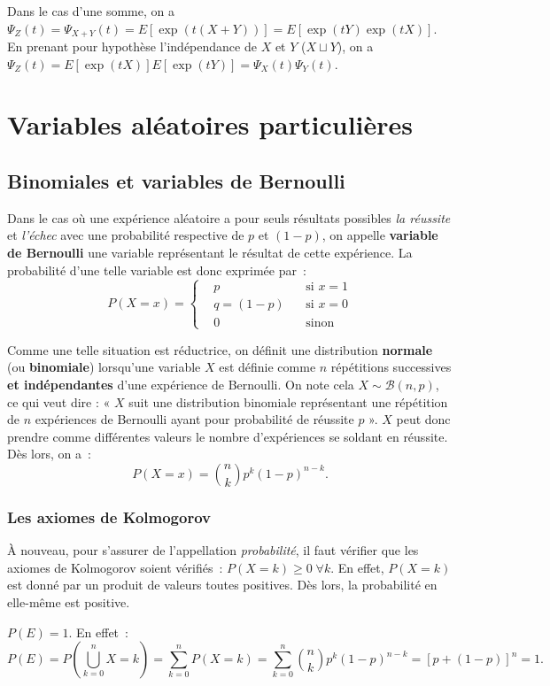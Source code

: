 \documentclass{article}
\begin{document}
			Dans le cas d'une somme, on a $\Psi_Z(t) = \Psi_{X+Y}(t) = E[\exp(t(X+Y))] = E[\exp(tY)\exp(tX)]$. En prenant pour hypothèse l'indépendance de $X$ et $Y$
			($X \sqcup Y$), on a $\Psi_Z(t) = E[\exp(tX)]E[\exp(tY)] = \Psi_X(t)\Psi_Y(t)$.

\section{Variables aléatoires particulières}
	\subsection{Binomiales et variables de Bernoulli}
		Dans le cas où une expérience aléatoire a pour seuls résultats possibles \textit{la réussite} et \textit{l'échec} avec une probabilité respective de $p$ et
		$(1-p)$, on appelle \textbf{variable de Bernoulli} une variable représentant le résultat de cette expérience. La probabilité d'une telle variable est donc
		exprimée par~:
		\[P(X = x) = \left\{\begin{aligned}&p &\text{ si $x = 1$}\\&q=(1-p)\;\; &\text{ si $x = 0$}\\&0 &\text{ sinon}\end{aligned}\right.\]

		Comme une telle situation est réductrice, on définit une distribution \textbf{normale} (ou \textbf{binomiale}) lorsqu'une variable $X$ est définie comme
		$n$ répétitions successives \textbf{et indépendantes} d'une expérience de Bernoulli. On note cela $X \sim \mathcal B(n, p)$, ce qui veut dire : « $X$ suit une
		distribution binomiale représentant une répétition de $n$ expériences de Bernoulli ayant pour probabilité de réussite $p$ ». $X$ peut donc prendre comme
		différentes valeurs le nombre d'expériences se soldant en réussite. Dès lors, on a~:
		\[P(X = x) = \binom nkp^k(1-p)^{n-k}.\]

		\subsubsection{Les axiomes de Kolmogorov}
			À nouveau, pour s'assurer de l'appellation \textit{probabilité}, il faut vérifier que les axiomes de Kolmogorov soient vérifiés~:
			$P(X=k) \geq 0 \; \forall k$. En effet, $P(X=k)$ est donné par un produit de valeurs toutes positives. Dès lors, la probabilité en elle-même est positive.

			$P(E) = 1.$ En effet~:
			\[P(E) = P\left(\bigcup_{k=0}^nX=k\right) = \sum_{k=0}^nP(X=k) = \sum_{k=0}^n\binom nkp^k(1-p)^{n-k} = \left[p + (1-p)\right]^n = 1.\]
\end{document}
